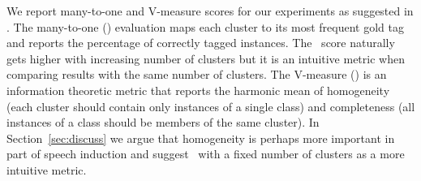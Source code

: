 We report many-to-one and V-measure scores for our experiments as
suggested in \cite{Christodoulopoulos:2010:TDU:1870658.1870714}.  The
many-to-one (\mto) evaluation maps each cluster to its most frequent
gold tag and reports the percentage of correctly tagged instances.
The \mto\ score naturally gets higher with increasing number of
clusters but it is an intuitive metric when comparing results with the
same number of clusters.  The V-measure (\vm) \cite{rosenberg2007v} is
an information theoretic metric that reports the harmonic mean of
homogeneity (each cluster should contain only instances of a single
class) and completeness (all instances of a class should be members of
the same cluster).  In Section~\ref{sec:discuss} we argue that
homogeneity is perhaps more important in part of speech induction and
suggest \mto\ with a fixed number of clusters as a more intuitive
metric.



